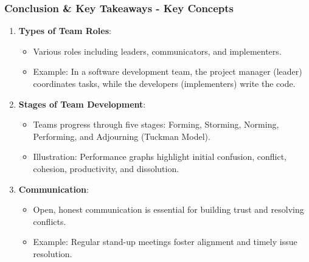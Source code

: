 \documentclass[aspectratio=169]{beamer}
\begin{document}
\begin{frame}[fragile]
    \frametitle{Conclusion \& Key Takeaways - Key Concepts}
    \begin{enumerate}
        \item \textbf{Types of Team Roles}:
        \begin{itemize}
            \item Various roles including leaders, communicators, and implementers.
            \item Example: In a software development team, the project manager (leader) coordinates tasks, while the developers (implementers) write the code.
        \end{itemize}
        
        \item \textbf{Stages of Team Development}:
        \begin{itemize}
            \item Teams progress through five stages: Forming, Storming, Norming, Performing, and Adjourning (Tuckman Model).
            \item Illustration: Performance graphs highlight initial confusion, conflict, cohesion, productivity, and dissolution.
        \end{itemize}
        
        \item \textbf{Communication}:
        \begin{itemize}
            \item Open, honest communication is essential for building trust and resolving conflicts.
            \item Example: Regular stand-up meetings foster alignment and timely issue resolution.
        \end{itemize}
    \end{enumerate}
\end{frame}
\end{document}

